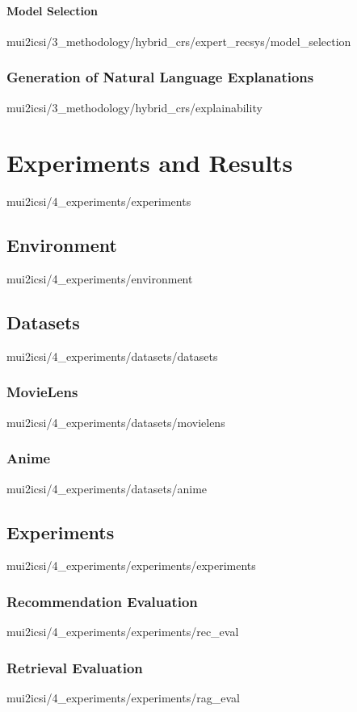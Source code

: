 \documentclass[english,epsbased,copyright,final,printable,covers,extendedindex,firstnumbered,tfm,gnuplot,loc,loe,lof,lot]{tfgtfmthesisuam}
\begin{document}
        \subsubsection{Model Selection\label{SSS:MODELSELECT}}{mui2icsi/3_methodology/hybrid_crs/expert_recsys/model_selection}
      \subsection{Generation of Natural Language Explanations\label{SS:GENEXPLAIN}}{mui2icsi/3_methodology/hybrid_crs/explainability}

  \chapter{Experiments and Results\label{CAP:EXPRES}}{mui2icsi/4_experiments/experiments}
    \section{Environment\label{SEC:ENVIRONMENT}}{mui2icsi/4_experiments/environment}

    \section{Datasets\label{SEC:DATASETS}}{mui2icsi/4_experiments/datasets/datasets}
      \subsection{MovieLens\label{SS:MOVIELENS}}{mui2icsi/4_experiments/datasets/movielens}
      \subsection{Anime\label{SS:LASTFM}}{mui2icsi/4_experiments/datasets/anime}

    \section{Experiments\label{SEC:EXPERIMENTS}}{mui2icsi/4_experiments/experiments/experiments}
      \subsection{Recommendation Evaluation\label{SS:RECEVAL}}{mui2icsi/4_experiments/experiments/rec_eval}
      \subsection{Retrieval Evaluation\label{SS:RAGEVAL}}{mui2icsi/4_experiments/experiments/rag_eval}
\end{document}
